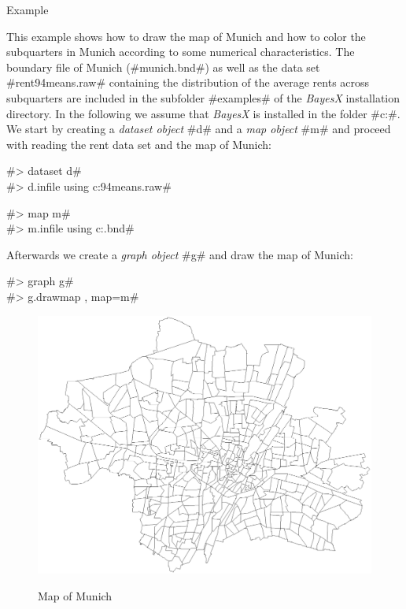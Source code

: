 \begin{stanza}{Example}

This example shows how to draw the map of Munich and how to color
the subquarters in Munich according to some numerical
characteristics. The boundary file of Munich (#munich.bnd#) as
well as the data set #rent94means.raw# containing the distribution
of the average rents across subquarters are included in the
subfolder #examples# of the {\em BayesX} installation directory.
In the following we assume that {\em BayesX} is installed in the
folder #c:\bayesx#. We start by creating a {\em dataset object}
#d# and a {\em map object} #m# and proceed with reading the rent
data set and the map of Munich:

#> dataset d# \\
#> d.infile using c:\bayesx\examples\rent94means.raw#

#> map m# \\
#> m.infile using c:\bayesx\examples\munich.bnd#

Afterwards we create a {\em graph object} #g# and draw the map of
Munich:

#> graph g# \\
#> g.drawmap , map=m#

\begin{figure}[htb]
\begin{center}
\includegraphics[scale=0.5]{grafiken/munichdrawmap.ps}
{\em\caption{ \label{munichdrawmap} Map of Munich}}
\end{center}
\end{figure}


\end{stanza}
